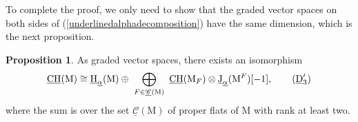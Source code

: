 \documentclass[11pt,reqno]{amsart}
\theoremstyle{definition}
\newtheorem{proposition}[theorem]{Proposition}
\theoremstyle{remark}
\renewcommand{\(}{\left(}
\renewcommand{\)}{\right)}
\newcommand{\<}{\left<}
\renewcommand{\>}{\right>}
\newcommand{\uJ}{\underline{\operatorname{J}}}
\newcommand{\CH}{\operatorname{CH}}
\newcommand{\uCH}{\underline{\CH}}
\begin{document}
To complete the proof, we only need to show that the graded vector spaces on both sides of  (\ref{underlinedalphadecomposition}) have the same dimension, which is the next proposition. 
\begin{proposition}
As graded vector spaces, there exists an isomorphism
\begin{equation}\label{num_decomposition}
\underline{\CH}(\mathrm{M}) \cong \underline{\mathrm{H}}_{\underline{\alpha}}(\mathrm{M}) \oplus \ \bigoplus_{F \in \underline{\mathscr{C}}(\mathrm{M})}  \  \uCH(\mathrm{M}_F)\otimes \uJ_{\underline{\alpha}}(\mathrm{M}^F)[-1],
\tag{$\underline{\mathrm{D}}_3'$}
\end{equation}
where the sum is over the set $\underline{\mathscr{C}}(\mathrm{M})$ of proper flats of $\mathrm{M}$ with rank at least two.
\end{proposition}
\end{document}
